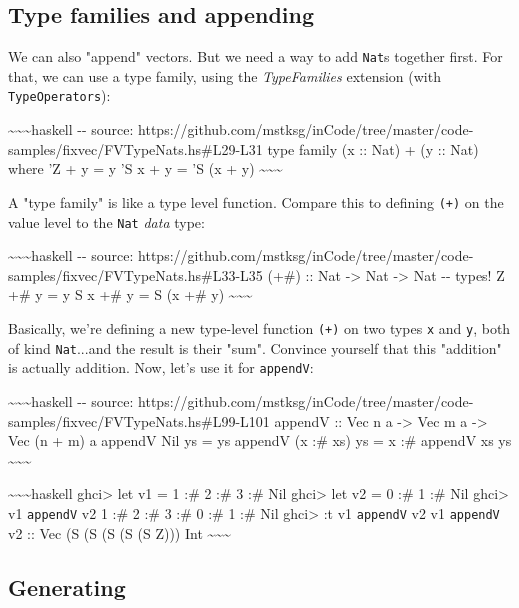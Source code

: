 \documentclass[]{article}
\begin{document}
\subsection{Type families and appending}

We can also "append" vectors. But we need a way to add \texttt{Nat}s together
first. For that, we can use a type family, using the \emph{TypeFamilies}
extension (with \texttt{TypeOperators}):

\textasciitilde{}\textasciitilde{}\textasciitilde{}haskell -\/- source:
https://github.com/mstksg/inCode/tree/master/code-samples/fixvec/FVTypeNats.hs\#L29-L31
type family (x :: Nat) + (y :: Nat) where 'Z + y = y 'S x + y = 'S (x + y)
\textasciitilde{}\textasciitilde{}\textasciitilde{}

A "type family" is like a type level function. Compare this to defining
\texttt{(+)} on the value level to the \texttt{Nat} \emph{data} type:

\textasciitilde{}\textasciitilde{}\textasciitilde{}haskell -\/- source:
https://github.com/mstksg/inCode/tree/master/code-samples/fixvec/FVTypeNats.hs\#L33-L35
(+\#) :: Nat -\textgreater{} Nat -\textgreater{} Nat -\/- types! Z +\# y = y S x
+\# y = S (x +\# y) \textasciitilde{}\textasciitilde{}\textasciitilde{}

Basically, we're defining a new type-level function \texttt{(+)} on two types
\texttt{x} and \texttt{y}, both of kind \texttt{Nat}...and the result is their
"sum". Convince yourself that this "addition" is actually addition. Now, let's
use it for \texttt{appendV}:

\textasciitilde{}\textasciitilde{}\textasciitilde{}haskell -\/- source:
https://github.com/mstksg/inCode/tree/master/code-samples/fixvec/FVTypeNats.hs\#L99-L101
appendV :: Vec n a -\textgreater{} Vec m a -\textgreater{} Vec (n + m) a appendV
Nil ys = ys appendV (x :\# xs) ys = x :\# appendV xs ys
\textasciitilde{}\textasciitilde{}\textasciitilde{}

\textasciitilde{}\textasciitilde{}\textasciitilde{}haskell ghci\textgreater{}
let v1 = 1 :\# 2 :\# 3 :\# Nil ghci\textgreater{} let v2 = 0 :\# 1 :\# Nil
ghci\textgreater{} v1 \texttt{appendV} v2 1 :\# 2 :\# 3 :\# 0 :\# 1 :\# Nil
ghci\textgreater{} :t v1 \texttt{appendV} v2 v1 \texttt{appendV} v2 :: Vec (S (S
(S (S (S Z))) Int \textasciitilde{}\textasciitilde{}\textasciitilde{}

\subsection{Generating}
\end{document}

